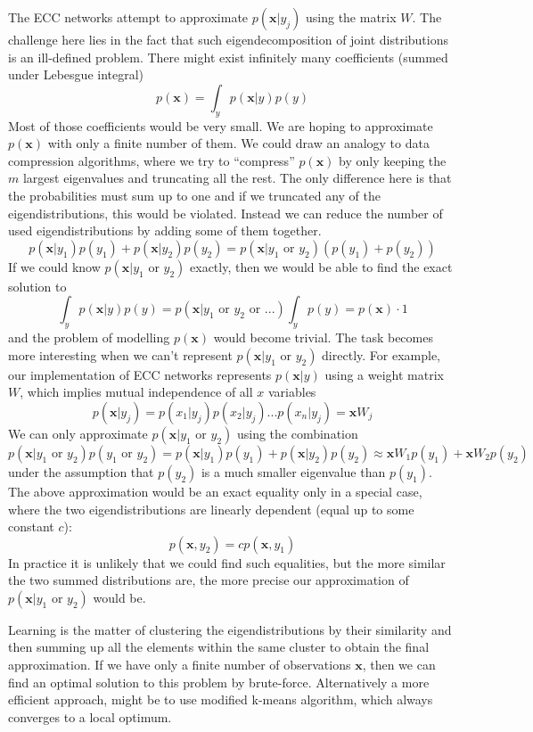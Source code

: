 \documentclass[12pt]{article}
\begin{document}
The ECC networks attempt to approximate $p(\boldsymbol{x}|y_j)$  using the matrix $W$. The challenge here lies in the fact that such eigendecomposition of joint distributions is an ill-defined problem. There might exist infinitely many coefficients (summed under Lebesgue integral)
\[
p(\boldsymbol{x})= \int_y p(\boldsymbol{x}|y) p(y)
\]
Most of those coefficients would be very small. We are hoping to approximate $p(\boldsymbol{x})$ with only a finite number of them. We could draw an analogy to data compression algorithms, where we try to ``compress'' $p(\boldsymbol{x})$ by only keeping the $m$ largest eigenvalues and truncating all the rest. The only difference here is that the probabilities must sum up to one and if we truncated any of the eigendistributions,  this would be violated. Instead we can reduce the number of used eigendistributions by adding some of them together. 
\[
p(\boldsymbol{x}|y_1) p(y_1)+p(\boldsymbol{x}|y_2) p(y_2) = 
p(\boldsymbol{x}|y_1\text{ or }y_2) (p(y_1)+p(y_2))
\]
If we could know $p(\boldsymbol{x}|y_1\text{ or }y_2)$ exactly, then we would be able to find the exact solution to 
\[
\int_y p(\boldsymbol{x}|y) p(y) = p(\boldsymbol{x}| y_1\text{ or }y_2 \text{ or }...)\int_y p(y)= p(\boldsymbol{x}) \cdot 1
\]
and the problem of modelling $p(\boldsymbol{x})$ would become trivial. The task becomes more interesting when we can't represent  $p(\boldsymbol{x}|y_1\text{ or }y_2)$ directly. For example, our implementation of ECC networks represents $p(\boldsymbol{x}|y)$ using a weight matrix $W$, which implies mutual independence of all $x$ variables
\[
p(\boldsymbol{x}|y_j) = p(x_1|y_j)p(x_2|y_j)...p(x_n|y_j) = \boldsymbol{x} W_j
\]
We can only approximate $p(\boldsymbol{x}|y_1\text{ or }y_2)$
using the combination
\[
p(\boldsymbol{x}|y_1\text{ or }y_2) p(y_1\text{ or }y_2)= p(\boldsymbol{x}|y_1) p(y_1)+p(\boldsymbol{x}|y_2) p(y_2) \approx \boldsymbol{x}W_1p(y_1) + \boldsymbol{x}W_2 p(y_2)
\]
under the assumption that $p(y_2)$ is a much smaller eigenvalue than $p(y_1)$.
The above approximation would be an exact equality only in a special case, where the two eigendistributions are linearly dependent (equal up to some constant $c$):
\[p(\boldsymbol{x},y_2)=c p(\boldsymbol{x},y_1)\]
In practice it is unlikely that we could find such equalities, but the more similar the two summed distributions are, the more precise our approximation of $p(\boldsymbol{x}|y_1\text{ or }y_2)$ would be. 

Learning is the matter of clustering the eigendistributions by their similarity and then summing up all the elements within the same cluster to obtain the final approximation. If we have only a finite number of observations $\boldsymbol{x}$, then we can find an optimal solution to this problem by brute-force. Alternatively a more efficient approach, might be to use modified k-means algorithm, which always converges to a local optimum. 
\end{document}
